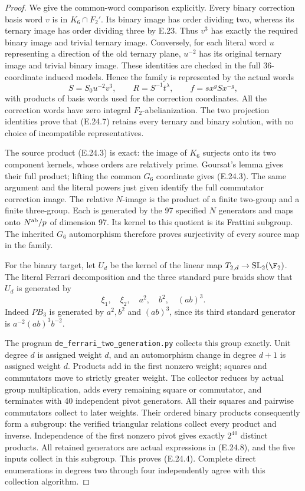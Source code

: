 \begin{proof}
We give the common-word
comparison explicitly.
Every binary correction
basis word $v$ is in
$K_6\cap F_2'$. Its
binary image has order
dividing two, whereas
its ternary image has
order dividing three
by E.23. Thus $v^3$
has exactly the required
binary image and trivial
ternary image. Conversely,
for each literal word
$u$ representing a
direction of the old
ternary plane, $u^{-2}$
has its original ternary
image and trivial binary
image. These identities
are checked in the
full 36-coordinate
induced models. Hence
the family is represented
by the actual words
\[
 S=S_0u^{-2}v^3,
 \qquad R=S^{-1}t^\lambda,
 \qquad f=sx^gSx^{-g},
 \tag{E.24.7}
\]
with products of basis
words used for the
correction coordinates.
All the correction
words have zero integral
$F_2$-abelianization.
The two projection
identities prove that
(E.24.7) retains every
ternary and binary
solution, with no
choice of incompatible
representatives.

The source product
(E.24.3) is exact:
the image of $K_6$
surjects onto its
two component kernels,
whose orders are
relatively prime.
Goursat's lemma gives
their full product;
lifting the common
$G_6$ coordinate gives
(E.24.3). The same
argument and the
literal powers just
given identify the
full commutator
correction image.
The relative $N$-image
is the product of a
finite two-group and
a finite three-group.
Each is generated
by the 97 specified
$N$ generators and
maps onto $N^{\rm ab}/p$
of dimension 97.
Its kernel to this
quotient is its
Frattini subgroup.
The inherited $G_6$
automorphism therefore
proves surjectivity
of every source map
in the family.

For the binary target,
let $U_d$ be the
kernel of the linear
map $T_{2,d}\to
\mathrm{SL}_2(\F_2)$.
The literal Ferrari
decomposition and the
three standard pure
braids show that
$U_d$ is generated by
\[
 \xi_1,\quad\xi_2,\quad
 a^2,\quad b^2,\quad(ab)^3.
 \tag{E.24.8}
\]
Indeed $PB_3$ is
generated by $a^2,b^2$
and $(ab)^3$, since
its third standard
generator is
$a^{-2}(ab)^3b^{-2}$.

The program
\texttt{de\_ferrari\_two\_generation.py}
collects this group
exactly. Unit degree
$d$ is assigned weight
$d$, and an automorphism
change in degree $d+1$
is assigned weight
$d$. Products add in
the first nonzero
weight; squares and
commutators move to
strictly greater
weight. The collector
reduces by actual
group multiplication,
adds every remaining
square or commutator,
and terminates with
40 independent pivot
generators. All their
squares and pairwise
commutators collect
to later weights.
Their ordered binary
products consequently
form a subgroup:
the verified triangular
relations collect every
product and inverse.
Independence of the
first nonzero pivot
gives exactly $2^{40}$
distinct products.
All retained generators
are actual expressions
in (E.24.8), and the
five inputs collect
in this subgroup.
This proves (E.24.4).
Complete direct
enumerations in degrees
two through four
independently agree
with this collection
algorithm.


\end{proof}
